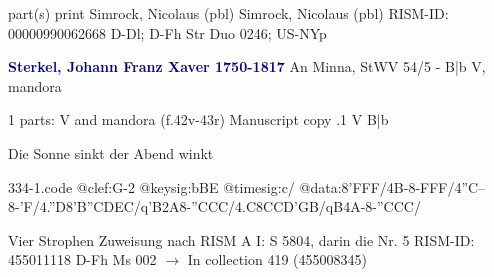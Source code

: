 \documentclass[twocolumn]{book}
\begin{document}
\newline \textcolor{darkblue}{}  part(s)
\newline print
\newline Simrock, Nicolaus  (pbl)
\newline Simrock, Nicolaus  (pbl)
\newline RISM-ID: 00000990062668
\newline D-Dl; D-Fh  Str Duo 0246; US-NYp
\newline \par \vspace{7pt} \textcolor{darkblue}{\textbf{Sterkel, Johann Franz Xaver  1750-1817}}
\newline An Minna, StWV 54/5 - B|b
\newline V, mandora
\newline \begin{itshape}\end{itshape} 
\newline \textcolor{darkblue}{}  1 parts: V and mandora  (f.42v-43r)
\newline Manuscript copy
.1  V  B|b
\newline \begin{footnotesize} Die Sonne sinkt der Abend winkt \end{footnotesize}  
\begin{filecontents*}{334-1.code}
@clef:G-2
@keysig:bBE
@timesig:c/
@data:8'FFF/4B-8-FFF/4''C--8-'F/4.''D8'B{''CD}{EC}/q'B2A8-''CCC/4.C8C{CD}{'GB}/qB4A-8-''CCC/
\end{filecontents*}
\newline
%

\newline Vier Strophen
\newline Zuweisung nach RISM A I: S 5804, darin die Nr. 5
\newline RISM-ID: 455011118
\newline D-Fh  Ms 002
\newline $\rightarrow$ In collection 419 (455008345)
      
\end{document}
